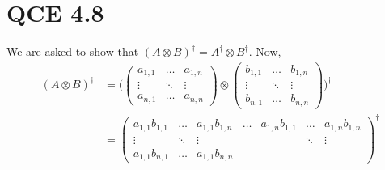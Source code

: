 \documentclass[10pt]{article}
\begin{document}
\section*{QCE 4.8}
We are asked to show that $(A \otimes B)^{\dag} = A^{\dag} \otimes B^{\dag}$. Now,
\begin{align*}
(A \otimes B)^{\dag} &=
\Bigg(
\begin{pmatrix}
a_{1, 1} & \dots & a_{1, n} \\
\vdots & \ddots & \vdots \\
a_{n, 1} & \dots & a_{n, n}
\end{pmatrix}
\otimes
\begin{pmatrix}
b_{1, 1} & \dots & b_{1, n} \\
\vdots & \ddots & \vdots \\
b_{n, 1} & \dots & b_{n, n}
\end{pmatrix}
\Bigg)^{\dag} \\
 &= 
 \begin{pmatrix}
 a_{1, 1} b_{1, 1} & \dots   & a_{1, 1} b_{1, n} & \dots & a_{1, n} b_{1, 1} & \dots  & a_{1, n} b_{1, n} \\
 \vdots               & \ddots & \vdots               &          &                          & \ddots & \vdots \\
 a_{1, 1} b_{n, 1} & \dots   & a_{1, 1} b_{n, n} & 
 \end{pmatrix}^{\dag}
\end{align*}
\end{document}
